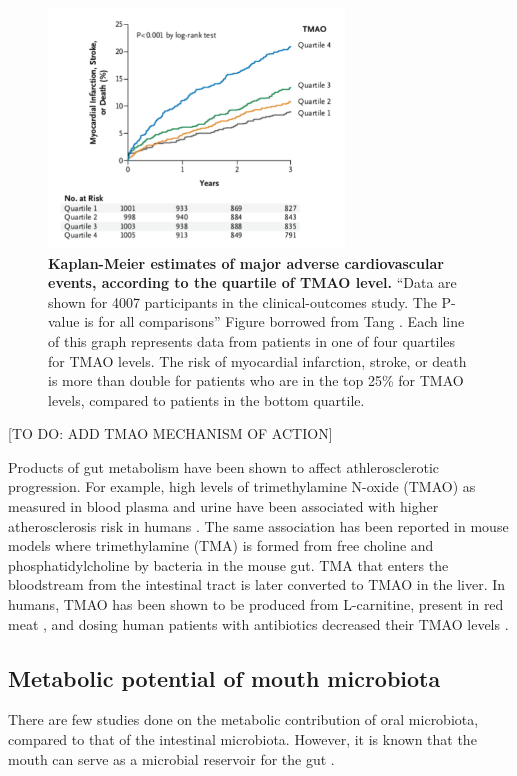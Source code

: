 \begin{figure}[h]
\begin{center}
\includegraphics[width=0.7\textwidth]{kaplan_meier.png}
\caption{\textbf{Kaplan-Meier estimates of major adverse cardiovascular events, according to the quartile of TMAO level.} “Data are shown for 4007 participants in the clinical-outcomes study. The P-value is for all comparisons” Figure borrowed from Tang \cite{tang2013intestinal}. Each line of this graph represents data from patients in one of four quartiles for TMAO levels. The risk of myocardial infarction, stroke, or death is more than double for patients who are in the top 25\% for TMAO levels, compared to patients in the bottom quartile.}
\end{center}
\end{figure}

[TO DO: ADD TMAO MECHANISM OF ACTION]

Products of gut metabolism have been shown to affect athlerosclerotic progression. For example, high levels of trimethylamine N-oxide (TMAO) as measured in blood plasma and urine have been associated with higher atherosclerosis risk in humans \cite{tang2013intestinal}. The same association has been reported in mouse models where trimethylamine (TMA) is formed from free choline \cite{al1992exogenous} and phosphatidylcholine \cite{wang2011gut} by bacteria in the mouse gut. TMA that enters the bloodstream from the intestinal tract is later converted to TMAO in the liver. In humans, TMAO has been shown to be produced from L-carnitine, present in red meat \cite{koeth2013intestinal}, and dosing human patients with antibiotics decreased their TMAO levels \cite{tang2013intestinal}.

\FloatBarrier

\subsection{Metabolic potential of mouth microbiota}
There are few studies done on the metabolic contribution of oral microbiota, compared to that of the intestinal microbiota. However, it is known that the mouth can serve as a microbial reservoir for the gut \cite{dal2006oral}.

